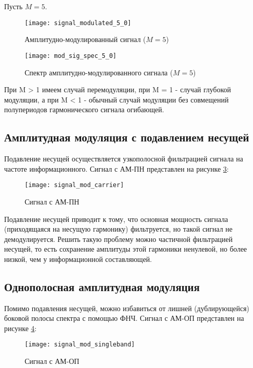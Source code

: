 Пусть $M = 5$.
\begin{figure}[H]
	\begin{center}
		\texttt{[image: signal\_modulated\_5\_0]}
		\caption{Амплитудно-модулированный сигнал ($M = 5$)} 
		\label{pic:signal_modulated_5_0} %
	\end{center}
\end{figure}
\begin{figure}[H]
	\begin{center}
		\texttt{[image: mod\_sig\_spec\_5\_0]}
		\caption{Спектр амплитудно-модулированного сигнала ($M = 5$)} 
		\label{pic:mod_sig_spec_5_0} %
	\end{center}
\end{figure}
При M > 1 имеем случай перемодуляции, при M = 1 - случай глубокой модуляции, а при M < 1 - обычный случай модуляции без совмещений полупериодов гармонического сигнала огибающей.

\subsection{Амплитудная модуляция с подавлением несущей}
Подавление несущей осуществляется узкополосной фильтрацией сигнала на частоте информационного. Сигнал с АМ-ПН представлен на рисунке \ref{pic:signal_mod_carrier}:
\begin{figure}[H]
	\begin{center}
		\texttt{[image: signal\_mod\_carrier]}
		\caption{Сигнал с АМ-ПН} 
		\label{pic:signal_mod_carrier} %
	\end{center}
\end{figure}
Подавление несущей приводит к тому, что основная мощность сигнала (приходящаяся на несущую гармонику) фильтруется, но такой сигнал не демодулируется. Решить такую проблему можно частичной фильтрацией несущей, то есть сохранение амплитуды этой гармоники ненулевой, но более низкой, чем у информационной составляющей.

\subsection{Однополосная амплитудная модуляция}
Помимо подавления несущей, можно избавиться от лишней (дублирующейся) боковой полосы спектра с помощью ФНЧ. Сигнал с АМ-ОП представлен на рисунке \ref{pic:signal_mod_singleband}:
\begin{figure}[H]
	\begin{center}
		\texttt{[image: signal\_mod\_singleband]}
		\caption{Сигнал с АМ-ОП} 
		\label{pic:signal_mod_singleband} %
	\end{center}
\end{figure}

